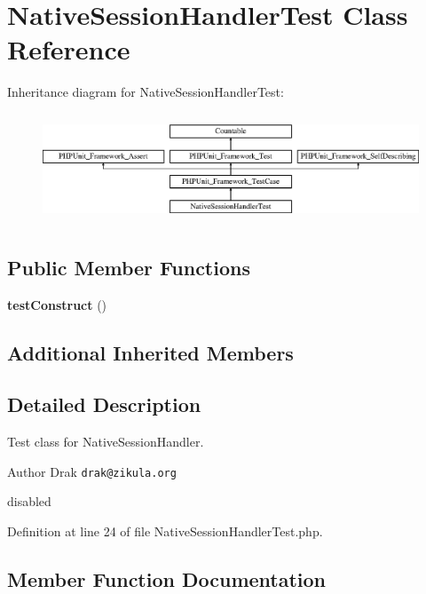 \section{Native\+Session\+Handler\+Test Class Reference}
\label{class_symfony_1_1_component_1_1_http_foundation_1_1_tests_1_1_session_1_1_storage_1_1_handler_1_1_native_session_handler_test}
Inheritance diagram for Native\+Session\+Handler\+Test\+:\begin{figure}[H]
\begin{center}
\leavevmode
\includegraphics[height=3.303835cm]{class_symfony_1_1_component_1_1_http_foundation_1_1_tests_1_1_session_1_1_storage_1_1_handler_1_1_native_session_handler_test}
\end{center}
\end{figure}
\subsection*{Public Member Functions}
\begin{DoxyCompactItemize}
\item 
{\bf test\+Construct} ()
\end{DoxyCompactItemize}
\subsection*{Additional Inherited Members}


\subsection{Detailed Description}
Test class for Native\+Session\+Handler.

\begin{DoxyAuthor}{Author}
Drak {\tt drak@zikula.\+org}
\end{DoxyAuthor}
disabled 

Definition at line 24 of file Native\+Session\+Handler\+Test.\+php.



\subsection{Member Function Documentation}
